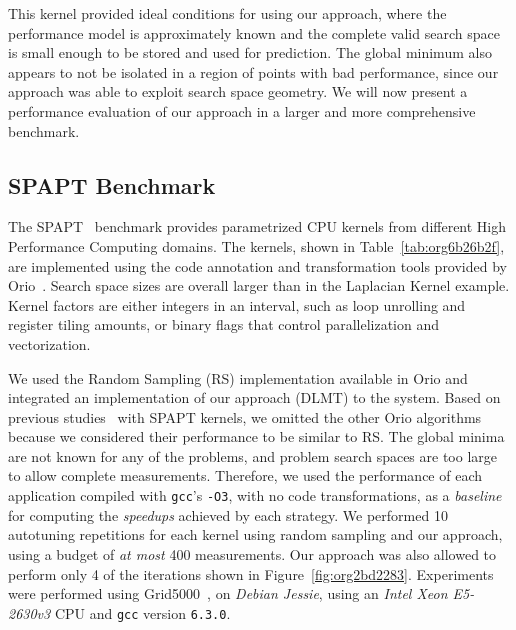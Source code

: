 \documentclass[conference]{IEEEtran}
\begin{document}
This kernel provided ideal conditions for using our approach, where the
performance model is approximately known and the complete valid search space is
small enough to be stored and used for prediction. The global minimum also
appears to not be isolated in a region of points with bad performance, since our
approach was able to exploit search space geometry. We will now present a
performance evaluation of our approach in a larger and more comprehensive
benchmark.
\subsection{SPAPT Benchmark}
\label{sec:org284ec23}
The SPAPT~\cite{balaprakash2012spapt} benchmark provides parametrized CPU
kernels from different High Performance Computing domains. The kernels, shown in
Table~\ref{tab:org6b26b2f}, are implemented using the code
annotation and transformation tools provided by
Orio~\cite{hartono2009annotation}. Search space sizes are overall larger
than in the Laplacian Kernel example. Kernel factors are either integers in an
interval, such as loop unrolling and register tiling amounts, or binary flags
that control parallelization and vectorization.

We used the Random Sampling (RS) implementation available in Orio and integrated
an implementation of our approach (DLMT) to the system. Based on previous
studies~\cite{balaprakash2011can,balaprakash2012experimental} with SPAPT
kernels, we omitted the other Orio algorithms because we considered their
performance to be similar to RS. The global minima are not known for any of the
problems, and problem search spaces are too large to allow complete
measurements. Therefore, we used the performance of each application compiled
with \texttt{gcc}'s \texttt{-O3}, with no code transformations, as a \emph{baseline}
for computing the \emph{speedups} achieved by each strategy. We performed 10
autotuning repetitions for each kernel using random sampling and our approach,
using a budget of \emph{at most} 400 measurements. Our approach was also allowed to
perform only 4 of the iterations shown in Figure~\ref{fig:org2bd2283}.
Experiments were performed using Grid5000~\cite{balouek2013adding}, on
\emph{Debian Jessie}, using an \emph{Intel Xeon E5-2630v3} CPU and \texttt{gcc} version
\texttt{6.3.0}.
\end{document}
